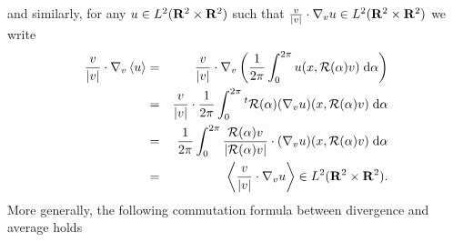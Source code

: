 \documentclass[12pt, a4paper]{article}
\providecommand\mathbb{\bf}
\newcommand\R{{\mathbb R}}
\newcommand{\ltxv}[0]{
L^2(\R ^2 \times \R ^2)}
\newcommand{\ave}[1]{
\left \langle #1 \right \rangle }
\begin{document}
and similarly, for any $u \in \ltxv{}$ such that $\frac{v}{|v|} \cdot \nabla _v u \in \ltxv{}$ we write
\begin{eqnarray}
\frac{v}{|v|} \cdot \nabla _v \ave{u} & = & \frac{v}{|v|} \cdot \nabla _v \left ( \frac{1}{2\pi} \int _0 ^{2\pi}  u (x, {\cal R}(\alpha) v ) \;\mathrm{d}\alpha   \right ) \nonumber \\
& = & \frac{v}{|v|} \cdot \frac{1}{2\pi} \int _0 ^{2\pi}  {^t {\cal R}} (\alpha) (\nabla _v u) (x, {\cal R}(\alpha) v ) \;\mathrm{d}\alpha \nonumber \\
& = & \frac{1}{2\pi} \int _0 ^{2\pi}  \frac{{\cal R} (\alpha) v}{|{\cal R} (\alpha)  v|} \cdot (\nabla _v u) (x, {\cal R}(\alpha) v ) \;\mathrm{d}\alpha \nonumber \\
& = & \ave{\frac{v}{|v|} \cdot \nabla _v u } \in \ltxv{}.\nonumber 
\end{eqnarray}
More generally, the following commutation formula between divergence and average holds
\end{document}
